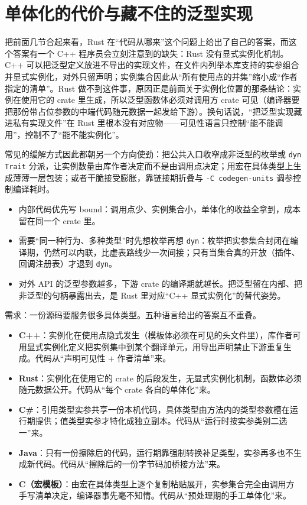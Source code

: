 \documentclass[12pt,a4paper,fontset=fandol]{ctexbook}
\newcommand{\cpp}[1]{C++#1}
\newcommand{\kw}[1]{\texttt{#1}}
\begin{document}
\section{单体化的代价与藏不住的泛型实现}

把前面几节合起来看，Rust 在“代码从哪来”这个问题上给出了自己的答案，而这个答案有一个 \cpp{} 程序员会立刻注意到的缺失：Rust 没有显式实例化机制。\cpp{} 可以把泛型定义放进不导出的实现文件，在文件内列举本库支持的实参组合并显式实例化，对外只留声明；实例集合因此从“所有使用点的并集”缩小成“作者指定的清单”。Rust 做不到这件事，原因正是前面关于实例化位置的那条结论：实例在使用它的 crate 里生成，所以泛型函数体必须对调用方 crate 可见（编译器要把那份带占位参数的中端代码随元数据一起发给下游）。换句话说，“把泛型实现藏进私有实现文件”在 Rust 里根本没有对应物——可见性语言只控制“能不能调用”，控制不了“能不能实例化”。

常见的缓解方式因此都朝另一个方向使劲：把公共入口收窄成非泛型的枚举或 \kw{dyn Trait} 分派，让实例数量由库作者决定而不是由调用点决定；用宏在具体类型上生成薄薄一层包装；或者干脆接受膨胀，靠链接期折叠与 \kw{-C codegen-units} 调参控制编译耗时。

\begin{bestpractice}[title={三条边界的取舍顺序}]
  \begin{itemize}
    \item 内部代码优先写 bound：调用点少、实例集合小，单体化的收益全拿到，成本留在同一个 crate 里。
    \item 需要“同一种行为、多种类型”时先想枚举再想 \kw{dyn}：枚举把实参集合封闭在编译期，仍然可以内联，比虚表路线少一次间接；只有当集合真的开放（插件、回调注册表）才退到 \kw{dyn}。
    \item 对外 API 的泛型参数越多，下游 crate 的编译期就越长。把泛型留在内部、把非泛型的句柄暴露出去，是 Rust 里对应“\cpp{} 显式实例化”的替代姿势。
  \end{itemize}
\end{bestpractice}

\begin{compare}[title={同一个需求下的五种“代码从哪来”}]
  需求：一份源码要服务很多具体类型。五种语言给出的答案互不重叠。
  \begin{itemize}
    \item \textbf{\cpp{}}：实例化在使用点隐式发生（模板体必须在可见的头文件里），库作者可用显式实例化定义把实例集中到某个翻译单元，用导出声明禁止下游重复生成。代码从“声明可见性 + 作者清单”来。
    \item \textbf{Rust}：实例化在使用它的 crate 的后段发生，无显式实例化机制，函数体必须随元数据公开。代码从“每个 crate 各自的单体化”来。
    \item \textbf{C\#}：引用类型实参共享一份本机代码，具体类型由方法内的类型参数槽在运行期提供；值类型实参才特化成独立副本。代码从“运行时按实参类别二选一”来。
    \item \textbf{Java}：只有一份擦除后的代码，运行期靠强制转换补足类型，实参再多也不生成新代码。代码从“擦除后的一份字节码加桥接方法”来。
    \item \textbf{C（宏模板）}：由宏在具体类型上逐个复制粘贴展开，实参集合完全由调用方手写清单决定，编译器事先毫不知情。代码从“预处理期的手工单体化”来。
  \end{itemize}
\end{compare}
\end{document}

